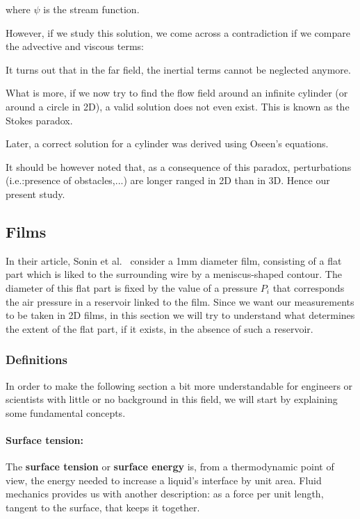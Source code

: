where $\psi$ is the stream function.

However, if we study this solution, we come across a contradiction if we compare the advective and viscous terms:

It turns out that in the far field, the inertial terms cannot be neglected anymore.

What is more, if we now try to find the flow field around an infinite cylinder (or around a circle in 2D), a valid solution does not even exist. This is known as the Stokes paradox.

Later, a correct solution for a cylinder was derived using Oseen's equations. 

It should be however noted that, as a consequence of this paradox, perturbations (i.e.:presence of obstacles,...) are longer ranged in 2D than in 3D. Hence our present study. 

\subsection{Films}
\label{films}

In their article, Sonin et al.~\cite{SONIN1994} consider a 1mm diameter film, consisting of a flat part which is liked to the surrounding wire by a meniscus-shaped contour. The diameter of this flat part is fixed by the value of a pressure $P_i$ that corresponds the air pressure in a reservoir linked to the film. Since we want our measurements to be taken in 2D films, in this section we will try to understand what determines the extent of the flat part, if it exists, in the absence of such a reservoir.

\subsubsection{Definitions}

In order to make the following section a bit more understandable for engineers or scientists with little or no background in this field, we will start by explaining some fundamental concepts.

\paragraph{Surface tension:}

The \textbf{surface tension} or \textbf{surface energy} is, from a thermodynamic point of view, the energy needed to increase a liquid's interface by unit area. Fluid mechanics provides us with another description: as a force per unit length, tangent to the surface, that keeps it together.

